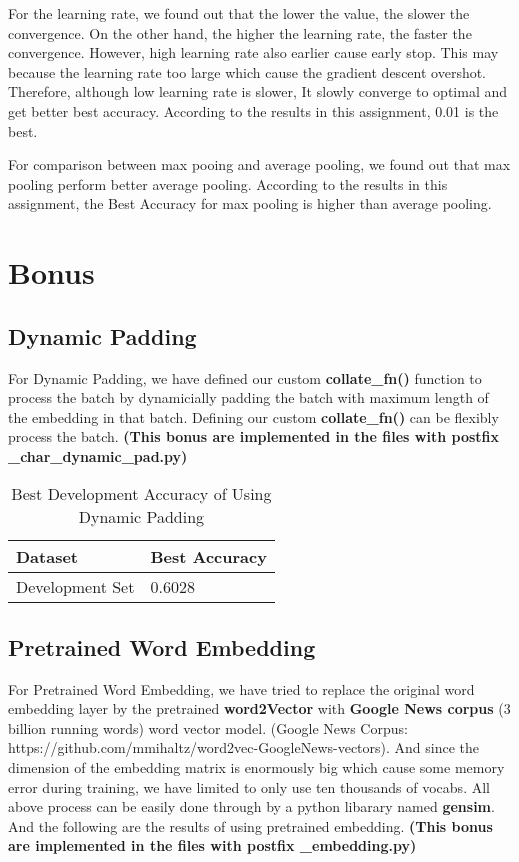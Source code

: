 \documentclass{article}
\begin{document}
For the learning rate, we found out that the lower the value, the slower the convergence. On the other hand, the higher the learning rate, the faster the convergence. However, high learning rate also earlier cause early stop. This may because the learning rate too large which cause the gradient descent overshot. Therefore, although low learning rate is slower, It slowly converge to optimal and get better best accuracy. According to the results in this assignment, 0.01 is the best.

For comparison between max pooing and average pooling, we found out that max pooling perform better average pooling. According to the results in this assignment, the Best Accuracy for max pooling is higher than average pooling.

\section{Bonus}

\subsection{Dynamic Padding}
For Dynamic Padding, we have defined our custom \textbf{collate\_fn()} function to process the batch by dynamicially padding the batch with maximum length of the embedding in that batch. Defining our custom \textbf{collate\_fn()} can be flexibly process the batch. \textbf{(This bonus are implemented in the files with postfix \_char\_dynamic\_pad.py)}

\begin{table}[htb]
	\caption{Best Development Accuracy of Using Dynamic Padding}
	\label{sample-table}
	\centering
	\begin{tabular}{ll}
		\toprule
		\cmidrule{1-2}
		Dataset & Best Accuracy\\
		\midrule
		Development Set & 0.6028  \\
		\bottomrule
	\end{tabular}
\end{table}


\subsection{Pretrained Word Embedding}
For Pretrained Word Embedding, we have tried to replace the original word embedding layer by the pretrained \textbf{word2Vector} with \textbf{Google News corpus} (3 billion running words) word vector model. (Google News Corpus: https://github.com/mmihaltz/word2vec-GoogleNews-vectors). And since the dimension of the embedding matrix is enormously big which cause some memory error during training, we have limited to only use ten thousands of vocabs. All above process can be easily done through by a python libarary named \textbf{gensim}. And the following are the results of using pretrained embedding. \textbf{(This bonus are implemented in the files with postfix \_embedding.py)}
\end{document}

